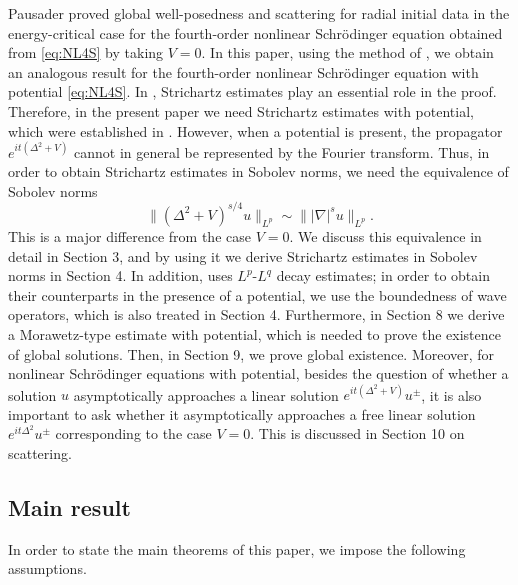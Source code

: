 \documentclass[11pt,a4paper]{article}
\numberwithin{equation}{section}
\begin{document}
Pausader \cite{Pau} proved global well-posedness and scattering for radial initial data in the energy-critical case for the fourth-order nonlinear Schr\"{o}dinger equation obtained from \eqref{eq:NL4S} by taking $V = 0$. In this paper, using the method of \cite{Pau}, we obtain an analogous result for the fourth-order nonlinear Schr\"{o}dinger equation with potential \eqref{eq:NL4S}. In \cite{Pau}, Strichartz estimates play an essential role in the proof. Therefore, in the present paper we need Strichartz estimates with potential, which were established in \cite{Miz}. However, when a potential is present, the propagator $e^{it(\Delta^{2} + V)}$ cannot in general be represented by the Fourier transform. Thus, in order to obtain Strichartz estimates in Sobolev norms, we need the equivalence of Sobolev norms
\[
\|(\Delta^{2} + V)^{s/4}u\|_{L^{p}} \sim \||\nabla|^{s}u\|_{L^{p}}.
\]
This is a major difference from the case $V = 0$. We discuss this equivalence in detail in Section 3, and by using it we derive Strichartz estimates in Sobolev norms in Section 4. In addition, \cite{Pau} uses $L^{p}$-$L^{q}$ decay estimates; in order to obtain their counterparts in the presence of a potential, we use the boundedness of wave operators, which is also treated in Section 4. Furthermore, in Section 8 we derive a Morawetz-type estimate with potential, which is needed to prove the existence of global solutions. Then, in Section 9, we prove global existence. Moreover, for nonlinear Schr\"{o}dinger equations with potential, besides the question of whether a solution $u$ asymptotically approaches a linear solution $e^{it(\Delta^{2} + V)}u^{\pm}$, it is also important to ask whether it asymptotically approaches a free linear solution $e^{it\Delta^{2}}u^{\pm}$ corresponding to the case $V = 0$. This is discussed in Section 10 on scattering.

\subsection{Main result}

In order to state the main theorems of this paper, we impose the following assumptions.
\end{document}
